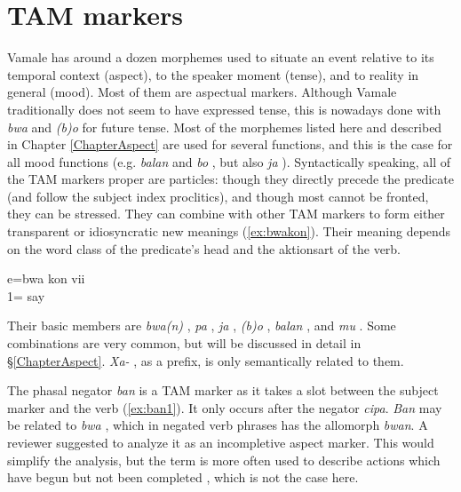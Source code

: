 \section{TAM markers}
\label{sec:TAM}
Vamale has around a dozen morphemes used to situate an event relative to its temporal context (aspect), to the speaker moment (tense), and to reality in general (mood). Most of them are aspectual markers. Although Vamale traditionally does not seem to have expressed tense, this is nowadays done with \textit{bwa}  and \textit{(b)o}  for future tense. Most of the morphemes listed here and described in Chapter \ref{ChapterAspect} are used for several functions, and this is the case for all mood functions (e.g. \textit{balan}  and \textit{bo} , but also \textit{ja} ). Syntactically speaking, all of the TAM markers proper are particles: though they directly precede the predicate (and follow the subject index proclitics), and though most cannot be fronted, they can be stressed. They can combine with other TAM markers to form either transparent or idiosyncratic new meanings (\ref{ex:bwakon}). Their meaning depends on the word class of the predicate's head and the aktionsart of the verb. 


\ea \label{ex:bwakon}
\gll e=bwa kon vii\\
 1=  say\\
\glt {}
\z

Their basic members are \textit{bwa(n)} , \textit{pa} , \textit{ja} , \textit{(b)o} , \textit{balan} , and \textit{mu} . Some combinations are very common, but will be discussed in detail in §\ref{ChapterAspect}. \textit{Xa-} , as a prefix, is only semantically related to them. 


The phasal negator \textit{ban}  is a TAM marker as it takes a slot between the subject marker and the verb (\ref{ex:ban1}). It only occurs after the negator \textit{cipa}. \textit{Ban} may be related to \textit{bwa} , which in negated verb phrases has the allomorph \textit{bwan}. A reviewer suggested to analyze it as an incompletive aspect marker. This would simplify the analysis, but the term is more often used to describe actions which have begun but not been completed \parencite{overall_typology_2017}, which is not the case here.%

